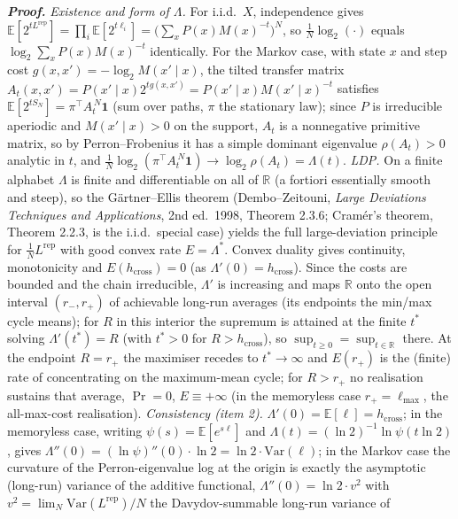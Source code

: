 \documentclass[
]{article}
\begin{document}
\emph{\textbf{Proof.}} \emph{Existence and form of $\Lambda$.} For i.i.d.\ $X$,
independence gives $\mathbb E[2^{tL^{\mathrm{rep}}}]=\prod_i\mathbb E[2^{t\ell_i}]
=\bigl(\sum_x P(x)M(x)^{-t}\bigr)^N$, so $\frac1N\log_2(\cdot)$ equals
$\log_2\sum_x P(x)M(x)^{-t}$ identically. For the Markov case, with state $x$ and
step cost $g(x,x')=-\log_2 M(x'\mid x)$, the tilted transfer matrix
$A_t(x,x')=P(x'\mid x)2^{tg(x,x')}=P(x'\mid x)M(x'\mid x)^{-t}$ satisfies
$\mathbb E[2^{tS_N}]=\pi^{\!\top}A_t^{\,N}\mathbf 1$ (sum over paths, $\pi$ the
stationary law); since $P$ is irreducible aperiodic and $M(x'\mid x)>0$ on the
support, $A_t$ is a nonnegative primitive matrix, so by Perron--Frobenius it has a
simple dominant eigenvalue $\rho(A_t)>0$ analytic in $t$, and
$\frac1N\log_2(\pi^{\!\top}A_t^{\,N}\mathbf 1)\to\log_2\rho(A_t)=\Lambda(t)$.
\emph{LDP.} On a finite alphabet $\Lambda$ is finite and differentiable on all of
$\mathbb R$ (a fortiori essentially smooth and steep), so the G\"artner--Ellis
theorem (Dembo--Zeitouni, \emph{Large Deviations Techniques and Applications},
2nd ed.\ 1998, Theorem 2.3.6; Cram\'er's theorem, Theorem 2.2.3, is the i.i.d.\
special case) yields the full large-deviation principle for $\frac1N
L^{\mathrm{rep}}$ with good convex rate $E=\Lambda^\ast$. Convex duality gives
continuity, monotonicity and $E(h_{\mathrm{cross}})=0$ (as $\Lambda'(0)=
h_{\mathrm{cross}}$). Since the costs are bounded and
the chain irreducible, $\Lambda'$ is increasing and maps $\mathbb R$ onto the open
interval $(r_-,r_+)$ of achievable long-run averages (its endpoints the min/max
cycle means); for $R$ in this interior the supremum is attained at the finite
$t^\ast$ solving $\Lambda'(t^\ast)=R$ (with $t^\ast>0$ for $R>h_{\mathrm{cross}}$), so
$\sup_{t\ge0}=\sup_{t\in\mathbb R}$ there. At the endpoint $R=r_+$ the maximiser
recedes to $t^\ast\to\infty$ and $E(r_+)$ is the (finite) rate of concentrating on the
maximum-mean cycle; for $R>r_+$ no realisation sustains that average, $\Pr=0$,
$E\equiv+\infty$ (in the memoryless case $r_+=\ell_{\max}$, the all-max-cost realisation). \emph{Consistency (item 2).} $\Lambda'(0)=\mathbb E[\ell]=h_{\mathrm{cross}}$;
in the memoryless case, writing $\psi(s)=\mathbb E[e^{s\ell}]$ and
$\Lambda(t)=(\ln2)^{-1}\ln\psi(t\ln2)$, gives $\Lambda''(0)=(\ln\psi)''(0)\cdot\ln2
=\ln2\cdot\mathrm{Var}(\ell)$; in the Markov case the curvature of the
Perron-eigenvalue log at the origin is exactly the asymptotic (long-run) variance of
the additive functional, $\Lambda''(0)=\ln2\cdot v^2$ with $v^2=\lim_N
\mathrm{Var}(L^{\mathrm{rep}})/N$ the Davydov-summable long-run variance of
\end{document}
